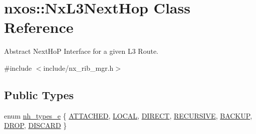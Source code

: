 \hypertarget{classnxos_1_1_nx_l3_next_hop}{}\section{nxos\+:\+:Nx\+L3\+Next\+Hop Class Reference}
\label{classnxos_1_1_nx_l3_next_hop}


Abstract Next\+HoP Interface for a given L3 Route.  




{\ttfamily \#include $<$include/nx\+\_\+rib\+\_\+mgr.\+h$>$}

\subsection*{Public Types}
\begin{DoxyCompactItemize}
\item 
enum \mbox{\hyperlink{classnxos_1_1_nx_l3_next_hop_ab58475e35a53b76cb9bdbfde04d537f3}{nh\+\_\+types\+\_\+e}} \{ \newline
\mbox{\hyperlink{classnxos_1_1_nx_l3_next_hop_ab58475e35a53b76cb9bdbfde04d537f3a912838c6148906933372bc719e6778b7}{A\+T\+T\+A\+C\+H\+ED}}, 
\mbox{\hyperlink{classnxos_1_1_nx_l3_next_hop_ab58475e35a53b76cb9bdbfde04d537f3ab073691a46b4482d1214e0da55f41587}{L\+O\+C\+AL}}, 
\mbox{\hyperlink{classnxos_1_1_nx_l3_next_hop_ab58475e35a53b76cb9bdbfde04d537f3a9259cb9dba5a62192e20458524d93bfa}{D\+I\+R\+E\+CT}}, 
\mbox{\hyperlink{classnxos_1_1_nx_l3_next_hop_ab58475e35a53b76cb9bdbfde04d537f3a6fb806fc312c9cc04dd11c1d0b772c2b}{R\+E\+C\+U\+R\+S\+I\+VE}}, 
\newline
\mbox{\hyperlink{classnxos_1_1_nx_l3_next_hop_ab58475e35a53b76cb9bdbfde04d537f3ae078b4acb489b4d29214764fe732bd5e}{B\+A\+C\+K\+UP}}, 
\mbox{\hyperlink{classnxos_1_1_nx_l3_next_hop_ab58475e35a53b76cb9bdbfde04d537f3af0d20d4eed57271845ddcb39a2451ce5}{D\+R\+OP}}, 
\mbox{\hyperlink{classnxos_1_1_nx_l3_next_hop_ab58475e35a53b76cb9bdbfde04d537f3a71e4b55f7ef95579440ef91cc247c2c7}{D\+I\+S\+C\+A\+RD}}
 \}
\end{DoxyCompactItemize}
